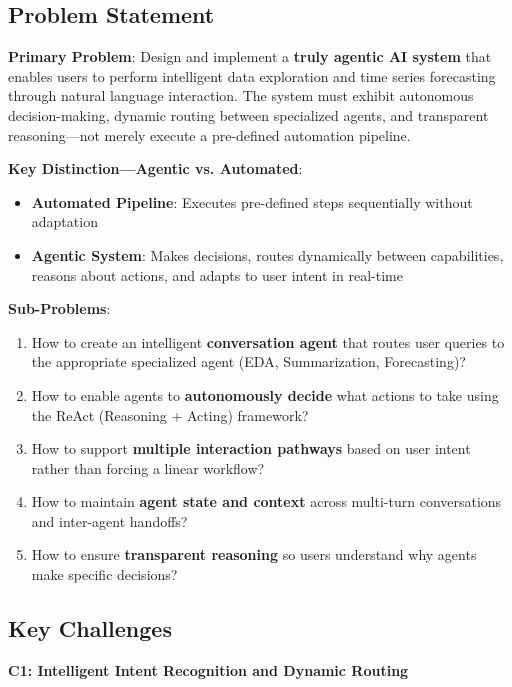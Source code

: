 \documentclass[11pt,a4paper]{article}
\begin{document}
\subsection{Problem Statement}

\textbf{Primary Problem}: Design and implement a \textbf{truly agentic AI system} that enables users to perform intelligent data exploration and time series forecasting through natural language interaction. The system must exhibit autonomous decision-making, dynamic routing between specialized agents, and transparent reasoning---not merely execute a pre-defined automation pipeline.

\textbf{Key Distinction---Agentic vs. Automated}:
\begin{itemize}
    \item \textbf{Automated Pipeline}: Executes pre-defined steps sequentially without adaptation
    \item \textbf{Agentic System}: Makes decisions, routes dynamically between capabilities, reasons about actions, and adapts to user intent in real-time
\end{itemize}

\textbf{Sub-Problems}:
\begin{enumerate}
    \item How to create an intelligent \textbf{conversation agent} that routes user queries to the appropriate specialized agent (EDA, Summarization, Forecasting)?
    \item How to enable agents to \textbf{autonomously decide} what actions to take using the ReAct (Reasoning + Acting) framework?
    \item How to support \textbf{multiple interaction pathways} based on user intent rather than forcing a linear workflow?
    \item How to maintain \textbf{agent state and context} across multi-turn conversations and inter-agent handoffs?
    \item How to ensure \textbf{transparent reasoning} so users understand why agents make specific decisions?
\end{enumerate}

\subsection{Key Challenges}

\textbf{C1: Intelligent Intent Recognition and Dynamic Routing}
\end{document}
